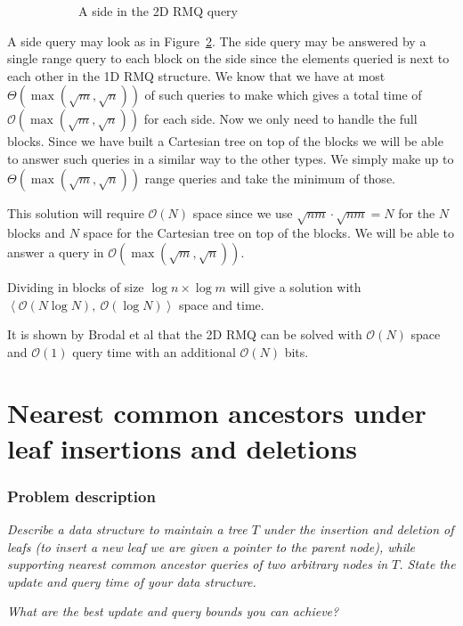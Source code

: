 \documentclass[a4paper,oneside,article,11pt]{memoir}
\begin{document}
\begin{figure}[htbp!]
\begin{subfigure}[b]{0.49\textwidth}
        \caption{A side in the 2D RMQ query}
        \label{fig:rmq_side}
    \end{subfigure}
    \caption{}
\end{figure}

A side query may look as in Figure~\ref{fig:rmq_side}. The side query may be answered by a single range query to each block on the side since the elements queried is next to each other in the 1D RMQ structure. We know that we have at most $\Theta(\max(\sqrt{m},\sqrt{n}))$ of such queries to make which gives a total time of $\mathcal{O}(\max(\sqrt{m},\sqrt{n}))$ for each side.
Now we only need to handle the full blocks. Since we have built a Cartesian tree on top of the blocks we will be able to answer such queries in a similar way to the other types. We simply make up to $\Theta(\max(\sqrt{m},\sqrt{n}))$ range queries and take the minimum of those.

This solution will require $\mathcal{O}(N)$ space since we use $\sqrt{nm} \cdot \sqrt{nm} = N$ for the $N$ blocks and $N$ space for the Cartesian tree on top of the blocks. We will be able to answer a query in $\mathcal{O}(\max(\sqrt{m},\sqrt{n}))$.

Dividing in blocks of size $\log n \times \log m$ will give a solution with $\left\langle \mathcal{O}(N\log N),\ \mathcal{O}(\log N)\right\rangle$ space and time.

It is shown by Brodal et al\cite{algorithmica12min} that the 2D RMQ can be solved with $\mathcal{O}(N)$ space and $\mathcal{O}(1)$ query time with an additional $\mathcal{O}(N)$ bits.


\chapter{Nearest common ancestors under leaf insertions and deletions}
\label{chp:LCA}
\subsection{Problem description}
\textit{Describe a data structure to maintain a tree $T$ under the insertion and deletion of leafs (to insert a new leaf we are given a pointer to the parent node), while supporting nearest common ancestor queries of two arbitrary nodes in $T$. State the update and query time of your data structure.}

\textit{What are the best update and query bounds you can achieve?}
\end{document}
